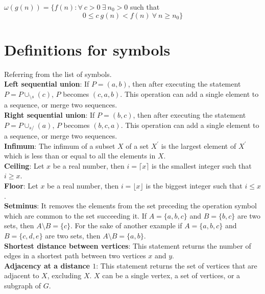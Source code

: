 $\omega(g(n)) = \{f(n) : \forall\ c>0\ \exists\ n_0>0$ such that \[0 \leq c\ g(n) < f(n)\ \forall\ n\geq n_0\}
\]

\section{Definitions for symbols}\label{section:definitions-for-symbols}

Referring from the list of symbols.\\

\textbf{Left sequential union}: If $P = (a,b)$, then after executing the statement $P = P \cup_{\setminus s} (c)$, $P$ becomes $(c, a, b)$. This operation can add a single element to a sequence, or merge two sequences.\\

\textbf{Right sequential union}: If $P = (b,c)$, then after executing the statement $P = P \cup_{s/} (a)$, $P$ becomes $(b, c, a)$. This operation can add a single element to a sequence, or merge two sequences.\\

\textbf{Infimum}: The infimum of a subset $X$ of a set $X^\prime$ is the largest element of $X^\prime$ which is less than or equal to all the elements in $X$.\\

\textbf{Ceiling}: Let $x$ be a real number, then $i = \lceil x\rceil$ is the smallest integer such that $i \geq x$.\\

\textbf{Floor}: Let $x$ be a real number, then $i = \lfloor x\rfloor$ is the biggest integer such that $i \leq x$.\\

\textbf{Setminus}: It removes the elements from the set preceding the operation symbol which are common to the set succeeding it. If $A = \{a, b, c\}$ and $B = \{b, c\}$ are two sets, then $A \setminus B = \{c\}$. For the sake of another example if $A = \{a, b, c\}$ and $B = \{c, d, e\}$ are two sets, then $A \setminus B = \{a, b\}$.\\

\textbf{Shortest distance between vertices}: This statement returns the number of edges in a shortest path between two vertices $x$ and $y$.\\

\textbf{Adjacency at a distance {\boldmath$1$}}: This statement returns the set of vertices that are adjacent to $X$, excluding $X$. $X$ can be a single vertex, a set of vertices, or a subgraph of $G$.\\

